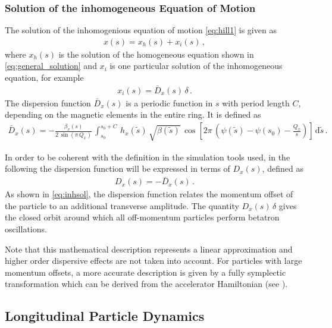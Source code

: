 \subsubsection{Solution of the inhomogeneous Equation of Motion}


The solution of the inhomogenious equation of motion \eqref{eq:hill1} is given as
%
\begin{align}
  x(s) = x_h(s) + x_i(s) \, , \label{eq:inhsol}
\end{align}
%
where $x_h(s)$ is the solution of the homogeneous equation shown in \eqref{eq:general_solution} and $x_i$ is one particular solution of the inhomogeneous equation, for example
%
\begin{align}
  x_i(s) = \bar{D}_x(s) \, \delta \, .
\end{align}
%
The dispersion function $\bar{D}_x(s)$ is a periodic function in $s$ with period length $C$, depending on the magnetic elements in the entire ring. It is defined as
%
\begin{align}
  \bar{D}_x (s) = - \frac{\beta_x(s)}{2 \, \sin (\pi \, Q_x)} \, \int_{s_0}^{s_0+C} \, h_x(\tilde{s}) \, \sqrt{\beta(\tilde{s})} \, \cos \left[ 2 \pi \, \left( \psi(\tilde{s}) - \psi(s_0) - \frac{Q_x}{s} \right) \right] \, \mathrm{d} \tilde{s} \, .
\end{align}

In order to be coherent with the definition in the simulation tools used, in the following the dispersion function will be expressed in terms of $D_x(s)$, defined as
%
\begin{align}
  D_x(s) = -\bar{D}_x(s) \, .
\end{align}
%
As shown in \eqref{eq:inhsol}, the dispersion function relates the momentum offset of the particle to an additional transverse amplitude. The quantity $D_x (s) \, \delta$ gives the closed orbit around which all off-momentum particles perform betatron oscillations. 


Note that this mathematical description represents a linear approximation and higher order dispersive effects are not taken into account. For particles with large momentum offsets, a more accurate description is given by a fully symplectic transformation which can be derived from the accelerator Hamiltonian (see ). 



\subsection{Longitudinal Particle Dynamics}

